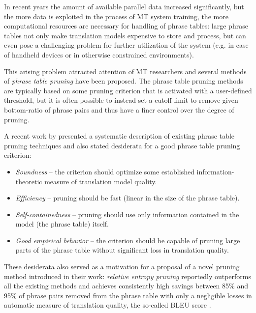 In recent years the amount of available parallel data increased significantly,
but the more data is exploited in the process of MT system training,
the more computational resources are necessary for handling of phrase tables:
large phrase tables not only make translation models expensive to store and process,
but can even pose a challenging problem for further utilization of the system
(e.g. in case of handheld devices or in otherwise constrained environments).

This arising problem attracted attention of MT researchers and several methods
of \emph{phrase table pruning} have been proposed.
The phrase table pruning methods are typically based on some pruning criterion
that is activated with a user-defined threshold, but it is often possible to instead
set a cutoff limit to remove given bottom-ratio of phrase pairs and thus have a finer
control over the degree of pruning.

A recent work by \citet{zens:systcomp} presented a systematic description of existing
phrase table pruning techniques and also stated desiderata for a good phrase table pruning
criterion:
\begin{itemize}
  \item \emph{Soundness} -- the criterion should optimize some established
    information-theoretic measure of translation model quality.
  \item \emph{Efficiency} -- pruning should be fast (linear in the size of the phrase table).
  \item \emph{Self-containedness} -- pruning should use only information contained in the model
  (the phrase table) itself.
  \item \emph{Good empirical behavior} -- the criterion should be capable of pruning large parts
    of the phrase table without significant loss in translation quality.
\end{itemize}

These desiderata also served as a motivation for a proposal of a novel pruning method introduced
in their work: \emph{relative entropy pruning} reportedly outperforms all the existing methods and
achieves consistently high savings between 85\% and 95\% of phrase pairs removed from the phrase
table with only a negligible losses in automatic measure of translation quality, the so-called
BLEU score \citep{papineni:bleu}.

